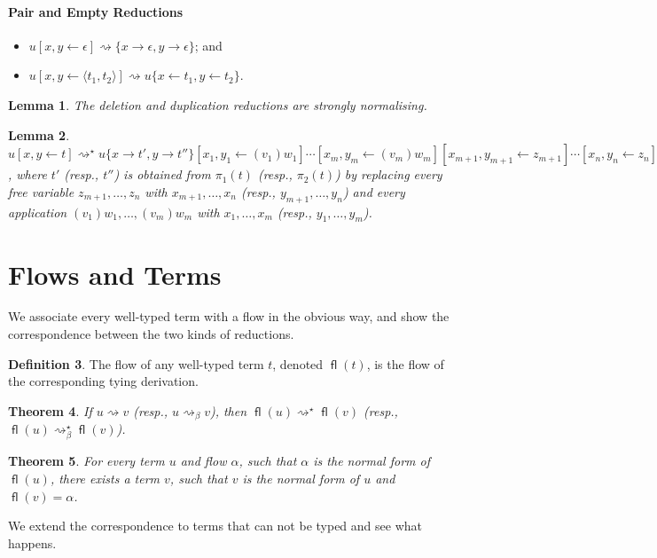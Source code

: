\documentclass[11pt,a4paper]{article}
\theoremstyle{definition}
\newtheorem{definition}{Definition}
\theoremstyle{plain}
\newtheorem{lemma}[definition]{Lemma}
\newtheorem{theorem}[definition]{Theorem}
\theoremstyle{remark}
\begin{document}
\paragraph{Pair and Empty Reductions}

\begin{itemize}
	\item $u[x,y\leftarrow\epsilon]\rightsquigarrow\{x\rightarrow\epsilon,y\rightarrow\epsilon\}$; and
	\item $u[x,y\leftarrow\langle t_1,t_2\rangle]\rightsquigarrow u\{x\leftarrow t_1,y\leftarrow t_2\}$.
\end{itemize}

\begin{lemma}
	The deletion and duplication reductions are strongly normalising.
\end{lemma}

\begin{lemma}
	$u[x,y\leftarrow t]\rightsquigarrow^\star u\{x\rightarrow t',y\rightarrow t''\}[x_1,y_1\leftarrow(v_1)w_1]\cdots[x_m,y_m\leftarrow(v_m)w_m][x_{m+1},y_{m+1}\leftarrow z_{m+1}]\cdots[x_n,y_n\leftarrow z_n][\leftarrow z_{n+1}]\cdots[\leftarrow z_p]$,
where $t'$ (resp., $t''$) is obtained from $\pi_1(t)$ (resp., $\pi_2(t)$) by replacing every free variable $z_{m+1},\dots,z_n$ with $x_{m+1},\dots,x_n$ (resp., $y_{m+1},\dots,y_n$) and every application $(v_1)w_1,\dots,(v_m)w_m$ with $x_1,\dots,x_m$ (resp., $y_1,\dots,y_m$).
\end{lemma}


\section{Flows and Terms}

We associate every well-typed term with a flow in the obvious way, and show the correspondence between the two kinds of reductions.

\newcommand{\fl}{{\mathop{\mathsf{fl}}}}

\begin{definition}
	The flow of any well-typed term $t$, denoted $\fl(t)$, is the flow of the corresponding tying derivation.
\end{definition}

\begin{theorem}
	If $u\rightsquigarrow v$ (resp., $u\rightsquigarrow_\beta v$), then $\fl(u)\rightsquigarrow^\star\fl(v)$ (resp., $\fl(u)\rightsquigarrow^\star_\beta\fl(v)$).
\end{theorem}

\begin{theorem}
	For every term $u$ and flow $\alpha$, such that $\alpha$ is the normal form of $\fl(u)$, there exists a term $v$, such that $v$ is the normal form of $u$ and $\fl(v)=\alpha$.
\end{theorem}

We extend the correspondence to terms that can not be typed and see what happens.
\end{document}
